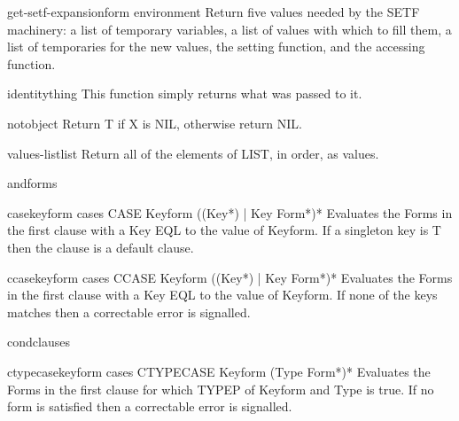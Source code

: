 \documentclass[10pt,english]{book}
\begin{document}
\begin{function}{get-setf-expansion}{form \op environment}
  Return five values needed by the SETF machinery: a list of temporary
   variables, a list of values with which to fill them, a list of temporaries
   for the new values, the setting function, and the accessing function.
\end{function}

\begin{function}{identity}{thing}
  This function simply returns what was passed to it.
\end{function}

\begin{function}{not}{object}
  Return T if X is NIL, otherwise return NIL.
\end{function}

\begin{function}{values-list}{list}
  Return all of the elements of LIST, in order, as values.
\end{function}

\begin{macro}{and}{\rest forms}
  
\end{macro}

\begin{macro}{case}{keyform \body cases}
  CASE Keyform {({(Key*) | Key} Form*)}*
  Evaluates the Forms in the first clause with a Key EQL to the value of
  Keyform. If a singleton key is T then the clause is a default clause.
\end{macro}

\begin{macro}{ccase}{keyform \body cases}
  CCASE Keyform {({(Key*) | Key} Form*)}*
  Evaluates the Forms in the first clause with a Key EQL to the value of
  Keyform. If none of the keys matches then a correctable error is
  signalled.
\end{macro}

\begin{macro}{cond}{\rest clauses}
  
\end{macro}

\begin{macro}{ctypecase}{keyform \body cases}
  CTYPECASE Keyform {(Type Form*)}*
  Evaluates the Forms in the first clause for which TYPEP of Keyform and Type
  is true. If no form is satisfied then a correctable error is signalled.
\end{macro}
\end{document}
